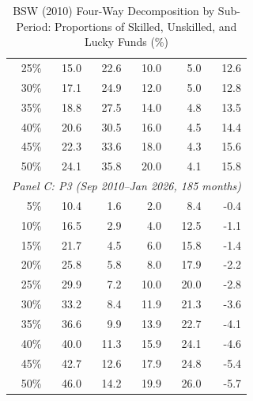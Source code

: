 \begin{table}[!htbp]
{\begin{tabular}[t]{rrrrrr}
\hspace{1em}25\% & 15.0 & 22.6 & 10.0 & 5.0 & 12.6\\
\hspace{1em}30\% & 17.1 & 24.9 & 12.0 & 5.0 & 12.8\\
\hspace{1em}35\% & 18.8 & 27.5 & 14.0 & 4.8 & 13.5\\
\hspace{1em}40\% & 20.6 & 30.5 & 16.0 & 4.5 & 14.4\\
\hspace{1em}45\% & 22.3 & 33.6 & 18.0 & 4.3 & 15.6\\
\hspace{1em}50\% & 24.1 & 35.8 & 20.0 & 4.1 & 15.8\\
\hline
\multicolumn{6}{l}{\textit{Panel C: P3 (Sep 2010--Jan 2026, 185 months)}}\\
\hspace{1em}5\% & 10.4 & 1.6 & 2.0 & 8.4 & -0.4\\
\hspace{1em}10\% & 16.5 & 2.9 & 4.0 & 12.5 & -1.1\\
\hspace{1em}15\% & 21.7 & 4.5 & 6.0 & 15.8 & -1.4\\
\hspace{1em}20\% & 25.8 & 5.8 & 8.0 & 17.9 & -2.2\\
\hspace{1em}25\% & 29.9 & 7.2 & 10.0 & 20.0 & -2.8\\
\hspace{1em}30\% & 33.2 & 8.4 & 11.9 & 21.3 & -3.6\\
\hspace{1em}35\% & 36.6 & 9.9 & 13.9 & 22.7 & -4.1\\
\hspace{1em}40\% & 40.0 & 11.3 & 15.9 & 24.1 & -4.6\\
\hspace{1em}45\% & 42.7 & 12.6 & 17.9 & 24.8 & -5.4\\
\hspace{1em}50\% & 46.0 & 14.2 & 19.9 & 26.0 & -5.7\\
\bottomrule
\end{tabular}%
}\sbefit
\setlength{\tabletempwidth}{\wd\tabletempbox}
\ifdim\tabletempwidth>\linewidth\setlength{\tabletempwidth}{\linewidth}\fi
\begin{minipage}{\tabletempwidth}
\captionsetup{width=\linewidth}
\caption{\label{tab:subperiod_bsw_decomposition}BSW (2010) Four-Way Decomposition by Sub-Period: Proportions of Skilled, Unskilled, and Lucky Funds (\%)}

\end{minipage}
\end{table}
